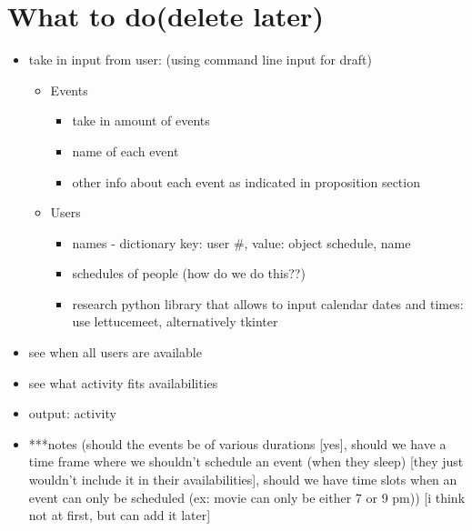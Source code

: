 \documentclass[pdftex,10pt,a4paper]{article}
\numberwithin{equation}{section} %
\begin{document}
\section*{What to do(delete later)}
\begin{itemize}
    \item take in input from user: (using command line input for draft)
    \begin{itemize}
        \item Events
        \begin{itemize}
            \item take in amount of events
            \item name of each event
            \item other info about each event as indicated in proposition section
        \end{itemize}
        \item Users 
            \begin{itemize}
            \item names - dictionary key: user #, value: object {schedule, name}
            \item schedules of people (how do we do this??)
            \item research python library that allows to input calendar dates and times: use lettucemeet, alternatively tkinter
            \end{itemize}
    \end{itemize}
    \item see when all users are available
    \item see what activity fits availabilities
    \item output: activity
    \item ***notes (should the events be of various durations [yes], should we have a time frame where we shouldn't schedule an event (when they sleep) [they just wouldn't include it in their availabilities], should we have time slots when an event can only be scheduled (ex: movie can only be either 7 or 9 pm)) [i think not at first, but can add it later]
\end{itemize}
\end{document}
